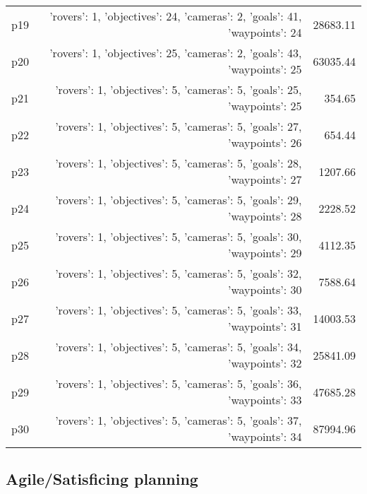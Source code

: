 \documentclass{article}
\begin{document}
\begin{center}
\begin{tabular}{@{}l|r|r@{}}
  p19&{'rovers': 1, 'objectives': 24, 'cameras': 2, 'goals': 41, 'waypoints': 24}&28683.11\\
  p20&{'rovers': 1, 'objectives': 25, 'cameras': 2, 'goals': 43, 'waypoints': 25}&63035.44\\
  p21&{'rovers': 1, 'objectives': 5, 'cameras': 5, 'goals': 25, 'waypoints': 25}&354.65\\
  p22&{'rovers': 1, 'objectives': 5, 'cameras': 5, 'goals': 27, 'waypoints': 26}&654.44\\
  p23&{'rovers': 1, 'objectives': 5, 'cameras': 5, 'goals': 28, 'waypoints': 27}&1207.66\\
  p24&{'rovers': 1, 'objectives': 5, 'cameras': 5, 'goals': 29, 'waypoints': 28}&2228.52\\
  p25&{'rovers': 1, 'objectives': 5, 'cameras': 5, 'goals': 30, 'waypoints': 29}&4112.35\\
  p26&{'rovers': 1, 'objectives': 5, 'cameras': 5, 'goals': 32, 'waypoints': 30}&7588.64\\
  p27&{'rovers': 1, 'objectives': 5, 'cameras': 5, 'goals': 33, 'waypoints': 31}&14003.53\\
  p28&{'rovers': 1, 'objectives': 5, 'cameras': 5, 'goals': 34, 'waypoints': 32}&25841.09\\
  p29&{'rovers': 1, 'objectives': 5, 'cameras': 5, 'goals': 36, 'waypoints': 33}&47685.28\\
  p30&{'rovers': 1, 'objectives': 5, 'cameras': 5, 'goals': 37, 'waypoints': 34}&87994.96
                            \end{tabular}
                            \end{center}
                    

                                \subsection*{Agile/Satisficing planning}
                                
\end{document}
